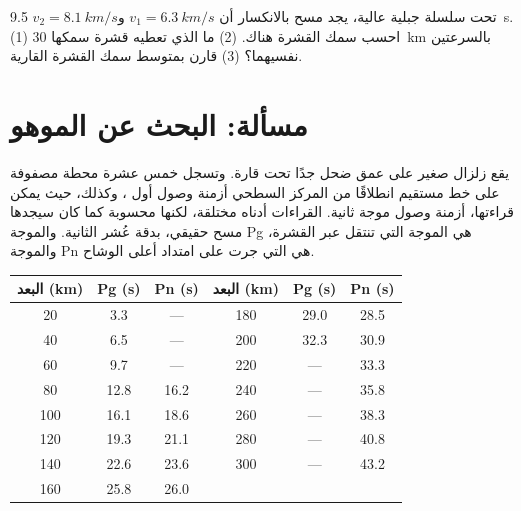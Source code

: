 \begin{exercise}[$\star\star\star$]\label{exo:g11:seismic-structure:15}
تحت سلسلة جبلية عالية، يجد مسح بالانكسار أن $v_1 =
\qty{6.3}{km/s}$ و$v_2 = \qty{8.1}{km/s}$ 
\qty{9.5}{s}. (1) احسب سمك القشرة هناك. (2) ما
 الذي تعطيه قشرة سمكها \qty{30}{km} بالسرعتين نفسيهما؟
(3) قارن بمتوسط سمك القشرة القارية.
\end{exercise}

\section{مسألة: البحث عن الموهو}

\begin{problem}
\label{pb:g11:seismic-structure:1}
يقع زلزال صغير على عمق ضحل جدًا تحت قارة.
وتسجل خمس عشرة محطة مصفوفة على خط مستقيم انطلاقًا من المركز السطحي
أزمنة وصول أول ، وكذلك، حيث يمكن قراءتها، أزمنة وصول موجة
ثانية. القراءات أدناه مختلقة، لكنها محسوبة كما كان سيجدها مسح
حقيقي، بدقة عُشر الثانية. والموجة Pg هي الموجة التي تنتقل
عبر القشرة، والموجة Pn هي التي جرت على امتداد أعلى الوشاح.

\begin{center}
\small
\begin{tabular}{|c|c|c||c|c|c|}
\hline
البعد (\unit{km}) & Pg (\unit{s}) & Pn (\unit{s}) & البعد (\unit{km}) & Pg (\unit{s}) & Pn (\unit{s}) \\ \hline
20 & 3.3 & --- & 180 & 29.0 & 28.5 \\ \hline
40 & 6.5 & --- & 200 & 32.3 & 30.9 \\ \hline
60 & 9.7 & --- & 220 & --- & 33.3 \\ \hline
80 & 12.8 & 16.2 & 240 & --- & 35.8 \\ \hline
100 & 16.1 & 18.6 & 260 & --- & 38.3 \\ \hline
120 & 19.3 & 21.1 & 280 & --- & 40.8 \\ \hline
140 & 22.6 & 23.6 & 300 & --- & 43.2 \\ \hline
160 & 25.8 & 26.0 & & & \\ \hline
\end{tabular}
\end{center}


\end{problem}
